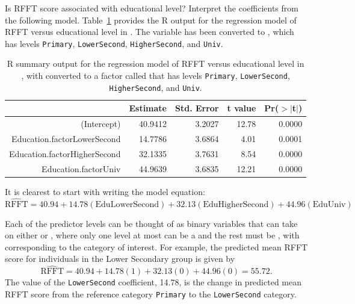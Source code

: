\begin{example}{Is RFFT score associated with educational level? Interpret the coefficients from the following model. Table~\ref{prevendRFFTEducationRegression} provides the \textsf{R} output for the regression model of RFFT versus educational level in . The variable  has been converted to , which has levels \texttt{Primary}, \texttt{LowerSecond}, \texttt{HigherSecond}, and \texttt{Univ}.
		
\begin{table}[ht]
	\centering
	\begin{tabular}{rrrrr}
		\hline
		& Estimate & Std. Error & t value & Pr($>$$|$t$|$) \\ 
		\hline
		(Intercept) & 40.9412 & 3.2027 & 12.78 & 0.0000 \\ 
		Education.factorLowerSecond & 14.7786 & 3.6864 & 4.01 & 0.0001 \\ 
		Education.factorHigherSecond & 32.1335 & 3.7631 & 8.54 & 0.0000 \\ 
		Education.factorUniv & 44.9639 & 3.6835 & 12.21 & 0.0000 \\ 
		\hline
	\end{tabular}
	\caption{\textsf{R} summary output for the regression model of RFFT versus educational level in , with  converted to a factor called  that has levels \texttt{Primary}, \texttt{LowerSecond}, \texttt{HigherSecond}, and \texttt{Univ}.}
		\label{prevendRFFTEducationRegression}
\end{table}		
		
}

It is clearest to start with writing the model equation:
\[\widehat{\text{RFFT}} =  40.94 + 14.78(\text{EduLowerSecond}) + 32.13(\text{EduHigherSecond}) + 44.96(\text{EduUniv})\]

Each of the predictor levels can be thought of as binary variables that can take on either  or , where only one level at most can be a  and the rest must be , with  corresponding to the category of interest. For example, the predicted mean RFFT score for individuals in the Lower Secondary group is given by
\[\widehat{\text{RFFT}} =  40.94 + 14.78(1) + 32.13(0) + 44.96(0) = 55.72. \]
The value of the \texttt{LowerSecond} coefficient, 14.78, is the change in predicted mean RFFT score from the reference category \texttt{Primary} to the \texttt{LowerSecond} category. 


\end{example}
